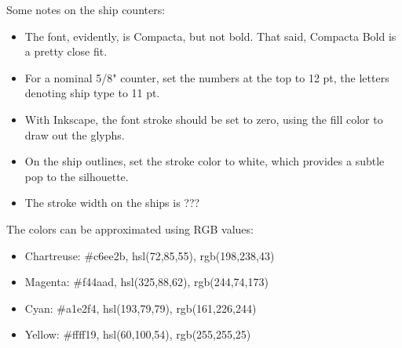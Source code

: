 \documentclass[10pt]{article}
\begin{document}
Some notes on the ship counters:

\begin{itemize}
  \item The font, evidently, is Compacta, but not bold. That said, Compacta Bold
    is a pretty close fit.
  \item For a nominal 5/8" counter, set the numbers at the top to 12 pt, the letters
    denoting ship type to 11 pt.
  \item With Inkscape, the font stroke should be set to zero, using the fill color to
    draw out the glyphs.
  \item On the ship outlines, set the stroke color to white, which provides a subtle pop
    to the silhouette.
  \item The stroke width on the ships is ???
\end{itemize}

The colors can be approximated using RGB values:

\begin{itemize}
  \item Chartreuse: \#c6ee2b, hsl(72,85,55), rgb(198,238,43)
  \item Magenta: \#f44aad, hsl(325,88,62), rgb(244,74,173)
  \item Cyan: \#a1e2f4, hsl(193,79,79), rgb(161,226,244)
  \item Yellow: \#ffff19, hsl(60,100,54), rgb(255,255,25)
\end{itemize}
\end{document}
